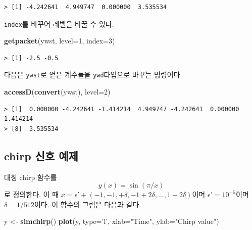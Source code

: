 \documentclass[b5paper,]{book}
\makeatletter
\newenvironment{Shaded}{\begin{snugshade}}{\end{snugshade}}
\newcommand{\KeywordTok}[1]{\textcolor[rgb]{0.13,0.29,0.53}{\textbf{{#1}}}}
\newcommand{\DataTypeTok}[1]{\textcolor[rgb]{0.13,0.29,0.53}{{#1}}}
\newcommand{\DecValTok}[1]{\textcolor[rgb]{0.00,0.00,0.81}{{#1}}}
\newcommand{\StringTok}[1]{\textcolor[rgb]{0.31,0.60,0.02}{{#1}}}
\newcommand{\NormalTok}[1]{{#1}}
\newenvironment{kframe}{%
\medskip{}
\setlength{\fboxsep}{.8em}
 \def\at@end@of@kframe{}%
 \ifinner\ifhmode%
  \def\at@end@of@kframe{\end{minipage}}%
  \begin{minipage}{\columnwidth}%
 \fi\fi%
 \def\FrameCommand##1{\hskip\@totalleftmargin \hskip-\fboxsep
 \colorbox{shadecolor}{##1}\hskip-\fboxsep
     \hskip-\linewidth \hskip-\@totalleftmargin \hskip\columnwidth}%
 \MakeFramed {\advance\hsize-\width
   \@totalleftmargin\z@ \linewidth\hsize
   \@setminipage}}%
 {\par\unskip\endMakeFramed%
 \at@end@of@kframe}
\renewenvironment{Shaded}{\begin{kframe}}{\end{kframe}}
\theoremstyle{definition}
\theoremstyle{definition}
\theoremstyle{definition}
\theoremstyle{remark}
\makeatother
\begin{document}
\begin{verbatim}
> [1] -4.242641  4.949747  0.000000  3.535534
\end{verbatim}

\texttt{index}를 바꾸어 레벨을 바꿀 수 있다.

\begin{Shaded}
\begin{Highlighting}[]
\KeywordTok{getpacket}\NormalTok{(ywst, }\DataTypeTok{level=}\DecValTok{1}\NormalTok{, }\DataTypeTok{index=}\DecValTok{3}\NormalTok{)}
\end{Highlighting}
\end{Shaded}

\begin{verbatim}
> [1] -2.5 -0.5
\end{verbatim}

다음은 \texttt{ywst}로 얻은 계수들을 \texttt{ywd}타입으로 바꾸는
명령어다.

\begin{Shaded}
\begin{Highlighting}[]
\KeywordTok{accessD}\NormalTok{(}\KeywordTok{convert}\NormalTok{(ywst), }\DataTypeTok{level=}\DecValTok{2}\NormalTok{)}
\end{Highlighting}
\end{Shaded}

\begin{verbatim}
> [1]  0.000000 -4.242641 -1.414214  4.949747 -4.242641  0.000000  1.414214
> [8]  3.535534
\end{verbatim}

\subsection{chirp 신호 예제}\label{chirp--}

대칭 chirp 함수를 \[y(x)=\sin(\pi/x)\] 로 정의한다. 이 때
\(x=\epsilon ' +(-1,-1,+\delta,-1+2\delta, \ldots, 1-2\delta)\)이며
\(\epsilon ' =10^{-5}\)이며 \(\delta=1/512\)이다. 이 함수의 그림은
다음과 같다.

\begin{Shaded}
\begin{Highlighting}[]
\NormalTok{y <-}\StringTok{ }\KeywordTok{simchirp}\NormalTok{()}
\KeywordTok{plot}\NormalTok{(y, }\DataTypeTok{type=}\StringTok{'l'}\NormalTok{, }\DataTypeTok{xlab=}\StringTok{"Time"}\NormalTok{, }\DataTypeTok{ylab=}\StringTok{"Chirp value"}\NormalTok{)}
\end{Highlighting}
\end{Shaded}
\end{document}
